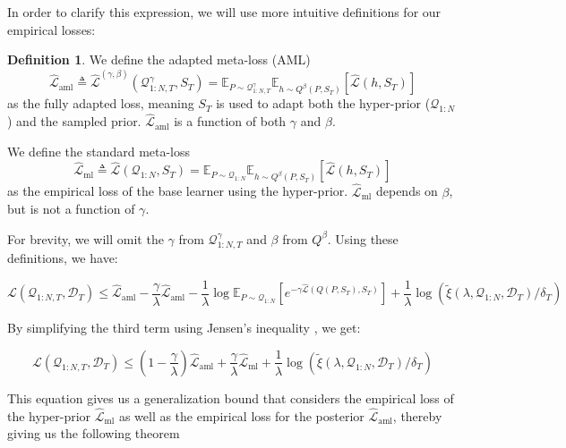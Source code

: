 \documentclass{article}
\theoremstyle{definition}
\newtheorem{defn}{Definition}[section]
\begin{document}
In order to clarify this expression, we will use more intuitive definitions for our empirical losses:
\begin{defn}
	We define the adapted meta-loss (AML) $$\hat{\mathcal{L}}_{\mathrm{aml}}\triangleq \hat{\mathcal{L}}^{(\gamma,\beta)}(\mathcal{Q}^{\gamma}_{1:N,T}, S_T)=\mathbb{E}_{P\sim \mathcal{Q}^{\gamma}_{1:N,T}}\mathbb{E}_{h\sim Q^{\beta}(P,S_T)}\left [\hat{\mathcal{L}}(h, S_T)\right ]$$ as the fully adapted loss, meaning $S_T$ is used to adapt both the hyper-prior ($\mathcal{Q}_{1:N}$) and the sampled prior. $\hat{\mathcal{L}}_{\mathrm{aml}}$ is a function of both $\gamma$ and $\beta$. 
	
	We define the standard meta-loss $$\hat{\mathcal{L}}_{\mathrm{ml}}\triangleq \hat{\mathcal{L}}(\mathcal{Q}_{1:N}, S_T)=\mathbb{E}_{P\sim \mathcal{Q}_{1:N}}\mathbb{E}_{h\sim Q^{\beta}(P,S_T)}\left [\hat{\mathcal{L}}(h, S_T)\right ]$$ as the empirical loss of the base learner using the hyper-prior. $\hat{\mathcal{L}}_{\mathrm{ml}}$ depends on $\beta$, but is not a function of $\gamma$.
\end{defn}

For brevity, we will omit the $\gamma$ from $\mathcal{Q}^{\gamma}_{1:N,T}$ and $\beta$ from $Q^{\beta}$. Using these definitions, we have:

$$\mathcal{L}(\mathcal{Q}_{1:N,T}, \mathcal{D}_T) \leq \hat{\mathcal{L}}_{\mathrm{aml}} -\frac{\gamma}{\lambda}\hat{\mathcal{L}}_{\mathrm{aml}} - \frac{1}{\lambda}\log \mathbb{E}_{P\sim \mathcal{Q}_{1:N}}\left [e^{-\gamma\hat{\mathcal{L}}(Q(P,S_T),S_T)}\right ]+\frac{1}{\lambda}\log\left (\tilde{\xi}(\lambda,\mathcal{Q}_{1:N},\mathcal{D}_T)/\delta_T\right )$$

By simplifying the third term using Jensen's inequality , we get:

\begin{equation} \label{eq:pb-adapt-multi}
\mathcal{L}(\mathcal{Q}_{1:N,T}, \mathcal{D}_T) \leq 
(1-\frac{\gamma}{\lambda})\hat{\mathcal{L}}_{\mathrm{aml}} + \frac{\gamma}{\lambda}\hat{\mathcal{L}}_{\mathrm{ml}} 
+\frac{1}{\lambda}\log\left (\tilde{\xi}(\lambda,\mathcal{Q}_{1:N},\mathcal{D}_T)/\delta_T\right )
\end{equation}

This equation gives us a generalization bound that considers the empirical loss of the hyper-prior $\hat{\mathcal{L}}_{\mathrm{ml}}$ as well as the empirical loss for the posterior $\hat{\mathcal{L}}_{\mathrm{aml}}$, thereby giving us the following theorem
\end{document}
